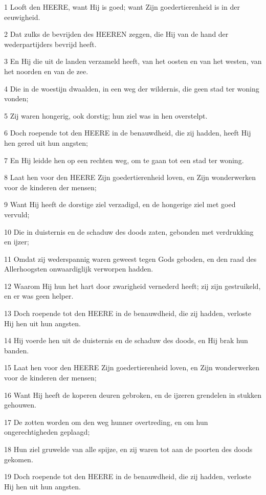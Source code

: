 \par 1 Looft den HEERE, want Hij is goed; want Zijn goedertierenheid is in der eeuwigheid.
\par 2 Dat zulks de bevrijden des HEEREN zeggen, die Hij van de hand der wederpartijders bevrijd heeft.
\par 3 En Hij die uit de landen verzameld heeft, van het oosten en van het westen, van het noorden en van de zee.
\par 4 Die in de woestijn dwaalden, in een weg der wildernis, die geen stad ter woning vonden;
\par 5 Zij waren hongerig, ook dorstig; hun ziel was in hen overstelpt.
\par 6 Doch roepende tot den HEERE in de benauwdheid, die zij hadden, heeft Hij hen gered uit hun angsten;
\par 7 En Hij leidde hen op een rechten weg, om te gaan tot een stad ter woning.
\par 8 Laat hen voor den HEERE Zijn goedertierenheid loven, en Zijn wonderwerken voor de kinderen der mensen;
\par 9 Want Hij heeft de dorstige ziel verzadigd, en de hongerige ziel met goed vervuld;
\par 10 Die in duisternis en de schaduw des doods zaten, gebonden met verdrukking en ijzer;
\par 11 Omdat zij wederspannig waren geweest tegen Gods geboden, en den raad des Allerhoogsten onwaardiglijk verworpen hadden.
\par 12 Waarom Hij hun het hart door zwarigheid vernederd heeft; zij zijn gestruikeld, en er was geen helper.
\par 13 Doch roepende tot den HEERE in de benauwdheid, die zij hadden, verloste Hij hen uit hun angsten.
\par 14 Hij voerde hen uit de duisternis en de schaduw des doods, en Hij brak hun banden.
\par 15 Laat hen voor den HEERE Zijn goedertierenheid loven, en Zijn wonderwerken voor de kinderen der mensen;
\par 16 Want Hij heeft de koperen deuren gebroken, en de ijzeren grendelen in stukken gehouwen.
\par 17 De zotten worden om den weg hunner overtreding, en om hun ongerechtigheden geplaagd;
\par 18 Hun ziel gruwelde van alle spijze, en zij waren tot aan de poorten des doods gekomen.
\par 19 Doch roepende tot den HEERE in de benauwdheid, die zij hadden, verloste Hij hen uit hun angsten.
